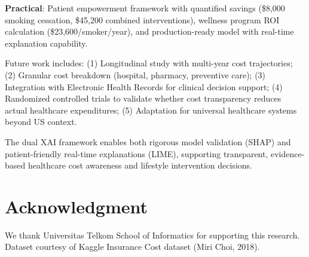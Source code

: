 \documentclass[conference]{IEEEtran}
\begin{document}
\textbf{Practical}: Patient empowerment framework with quantified savings (\$8,000 smoking cessation, \$45,200 combined interventions), wellness program ROI calculation (\$23,600/smoker/year), and production-ready model with real-time explanation capability.

Future work includes: (1) Longitudinal study with multi-year cost trajectories; (2) Granular cost breakdown (hospital, pharmacy, preventive care); (3) Integration with Electronic Health Records for clinical decision support; (4) Randomized controlled trials to validate whether cost transparency reduces actual healthcare expenditures; (5) Adaptation for universal healthcare systems beyond US context.

The dual XAI framework enables both rigorous model validation (SHAP) and patient-friendly real-time explanations (LIME), supporting transparent, evidence-based healthcare cost awareness and lifestyle intervention decisions.

\section*{Acknowledgment}
We thank Universitas Telkom School of Informatics for supporting this research. Dataset courtesy of Kaggle Insurance Cost dataset (Miri Choi, 2018).
\end{document}
